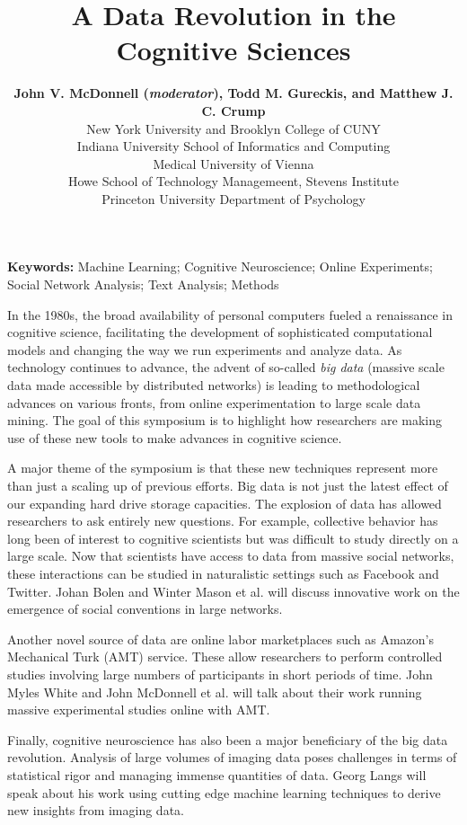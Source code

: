 \documentclass[10pt,letterpaper]{article}
\title{A Data Revolution in the Cognitive Sciences}
\author{{\large \bf John V. McDonnell (\emph{moderator}), Todd M. Gureckis, and
Matthew J. C. Crump}\\ New York University and Brooklyn College of CUNY 
  \AND {\large \bf Johan Bolen} \\
  Indiana University School of Informatics and Computing
  \AND {\large \bf Georg Langs} \\
  Medical University of Vienna
  \AND {\large \bf Winter Mason, Meeyoung Cha, Krishna Gummadi, Farshad Kooti, and Haeryun Yang} \\
  Howe School of Technology Managemeent, Stevens Institute 
  \AND {\large \bf John Myles White} \\
  Princeton University Department of Psychology }
\begin{document}
\maketitle

\begin{footnotesize}
\textbf{Keywords:} 
Machine Learning; Cognitive Neuroscience; Online Experiments; Social Network
Analysis; Text Analysis; Methods
\end{footnotesize}

In the 1980s, the broad availability of personal computers fueled a renaissance
in cognitive science, facilitating the development of sophisticated computational
models and changing the way we run experiments and analyze data. As technology
continues to advance, the advent of so-called \emph{big data} (massive scale data
made accessible by distributed networks) is leading to methodological advances on
various fronts, from online experimentation to large scale data mining. The goal
of this symposium is to highlight how researchers are making use of these new
tools to make advances in cognitive science.

A major theme of the symposium is that these new techniques represent more than
just a scaling up of previous efforts. Big data is not just the latest effect of
our expanding hard drive storage capacities. The explosion of data has allowed
researchers to ask entirely new questions. For example, collective behavior has
long been of interest to cognitive scientists but was difficult to study directly
on a large scale. Now that scientists have access to data from massive social
networks, these interactions can be studied in naturalistic settings such as
Facebook and Twitter. Johan Bolen and Winter Mason et al. will discuss innovative
work on the emergence of social conventions in large networks.

Another novel source of data are online labor marketplaces such as Amazon's
Mechanical Turk (AMT) service. These allow researchers to perform controlled
studies involving large numbers of participants in short periods of time. John
Myles White and John McDonnell et al. will talk about their work running massive
experimental studies online with AMT.

Finally, cognitive neuroscience has also been a major beneficiary of the big data
revolution. Analysis of large volumes of imaging data poses challenges in terms
of statistical rigor and managing immense quantities of data. Georg Langs will
speak about his work using cutting edge machine learning techniques to derive new
insights from imaging data.
\end{document}
